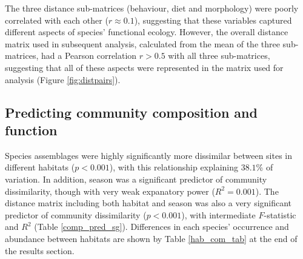 \documentclass[12pt,a4paper]{article}\usepackage[]{graphicx}\usepackage[]{color}
\begin{document}
The three distance sub-matrices (behaviour, diet and morphology) were poorly correlated with each other ($r \approx 0.1$), suggesting that these variables captured different aspects of species' functional ecology. 
However, the overall distance matrix used in subsequent analysis, calculated from the mean of the three sub-matrices, had a Pearson correlation $r > 0.5$ with all three sub-matrices, suggesting that all of these aspects were represented in the matrix used for analysis (Figure \ref{fig:distpairs}).

\clearpage
\subsection{Predicting community composition and function}



Species assemblages were highly significantly more dissimilar between sites in different habitats ($p < 0.001$), with this relationship explaining $38.1$\% of variation. In addition, season was a significant predictor of community dissimilarity, though with very weak expanatory power ($R^2 = 0.001$). The distance matrix including both habitat and season was also a very significant predictor of community dissimilarity ($p < 0.001$), with intermediate $F$-statistic and $R^2$ (Table \ref{comp_pred_sg}). Differences in each species' occurrence and abundance between habitats are shown by Table \ref{hab_com_tab} at the end of the results section.
\end{document}
